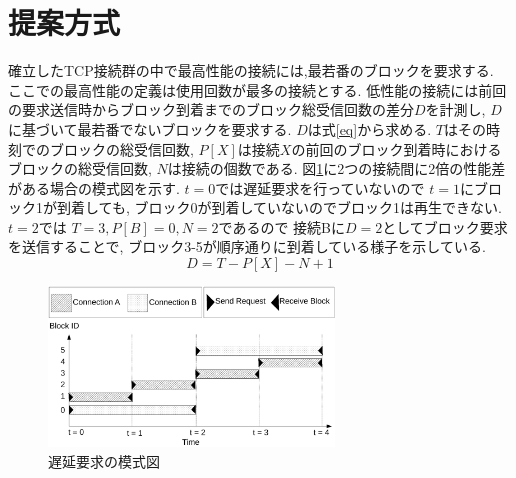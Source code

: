 \documentclass{ltjsarticle}
\begin{document}
\section{提案方式}
\vspace{-3mm}
確立したTCP接続群の中で最高性能の接続には,最若番のブロックを要求する.
ここでの最高性能の定義は使用回数が最多の接続とする.
低性能の接続には前回の要求送信時からブロック到着までのブロック総受信回数の差分\begin{math}D\end{math}を計測し,
\begin{math}D\end{math}に基づいて最若番でないブロックを要求する.
\begin{math}D\end{math}は式\ref{eq}から求める.
\begin{math}T\end{math}はその時刻でのブロックの総受信回数,
\begin{math}P[X]\end{math}は接続\begin{math}X\end{math}の前回のブロック到着時におけるブロックの総受信回数,
\begin{math}N\end{math}は接続の個数である.
図\ref{delay}に2つの接続間に2倍の性能差がある場合の模式図を示す.
\begin{math}t=0\end{math}では遅延要求を行っていないので
\begin{math}t=1\end{math}にブロック1が到着しても,
ブロック0が到着していないのでブロック1は再生できない.
\begin{math}t=2\end{math}では
\begin{math}T=3, P[B]=0, N=2\end{math}であるので
接続Bに\begin{math}D=2\end{math}としてブロック要求を送信することで,
ブロック3-5が順序通りに到着している様子を示している.
\vspace{-3.5mm}
\begin{equation}
	\label{eq}
	D = T - P[X] - N + 1
\end{equation}
\vspace{-8mm}
\begin{figure}[h]
	\centering
	\includegraphics[width=7.6cm]{figure/delay.pdf}
	\vspace{-4mm}
	\caption{遅延要求の模式図}
	\label{delay}
\end{figure}
\vspace{-12mm}
\end{document}
